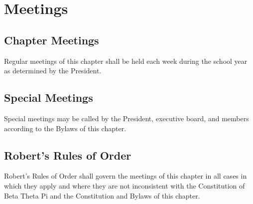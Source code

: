 \chapter{Meetings}
\label{cha:meetings}

\section{Chapter Meetings}
\label{sec:chapter-meetings}

Regular meetings of this chapter shall be held each week during the school year
as determined by the President.

\section{Special Meetings}
\label{sec:special-meetings}

Special meetings may be called by the President, executive board, and members
according to the Bylaws of this chapter.

\section{Robert's Rules of Order}
\label{sec:roberts-rules-of-order}

Robert's Rules of Order shall govern the meetings of this chapter in all cases
in which they apply and where they are not inconsistent with the Constitution of
Beta Theta Pi and the Constitution and Bylaws of this chapter.

